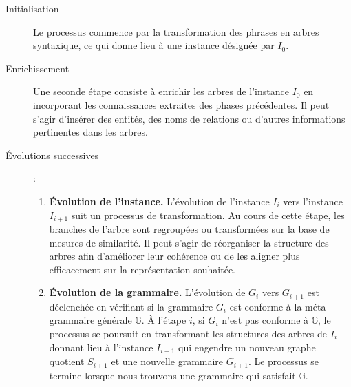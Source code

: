 \begin{description}
    \item[Initialisation] Le processus commence par la transformation des phrases en arbres syntaxique, ce qui donne lieu à une instance désignée par $I_0$.

    \item[Enrichissement] Une seconde étape consiste à enrichir les arbres de l'instance $I_0$ en incorporant les connaissances extraites des phases précédentes.
          Il peut s'agir d'insérer des entités, des noms de relations ou d'autres informations pertinentes dans les arbres.

    \item[Évolutions successives] :

          \begin{enumerate}
              \item \textbf{Évolution de l'instance.}
                    L'évolution de l'instance $I_i$ vers l'instance $I_{i+1}$ suit un processus de transformation.
                    Au cours de cette étape, les branches de l'arbre sont regroupées ou transformées sur la base de mesures de similarité. Il peut s'agir de réorganiser la structure des arbres afin d'améliorer leur cohérence ou de les aligner plus efficacement sur la représentation souhaitée.

              \item \textbf{Évolution de la grammaire.}
                    L'évolution de $G_i$ vers $G_{i+1}$ est déclenchée en vérifiant si la grammaire $G_i$ est conforme à la méta-grammaire générale $\mathbb{G}$.
                    À l'étape $i$, si $G_i$ n'est pas conforme à $\mathbb{G}$, le processus se poursuit en transformant les structures des arbres de $I_i$ donnant lieu à l'instance $I_{i+1}$ qui engendre un nouveau graphe quotient $S_{i+1}$ et une nouvelle grammaire $G_{i+1}$.
                    Le processus se termine lorsque nous trouvons une grammaire qui satisfait $\mathbb{G}$.
          \end{enumerate}
\end{description}

